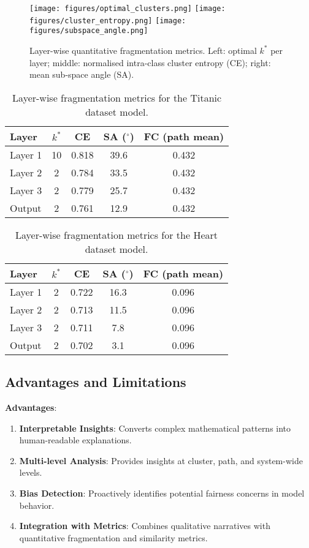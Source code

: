 \begin{figure}[t]
    \centering
    \texttt{[image: figures/optimal\_clusters.png]}
    \texttt{[image: figures/cluster\_entropy.png]}
    \texttt{[image: figures/subspace\_angle.png]}
    \caption{Layer-wise quantitative fragmentation metrics.
    Left: optimal $k^*$ per layer;
    middle: normalised intra-class cluster entropy (CE);
    right: mean sub-space angle (SA).}
    \label{fig:fragmentation_metrics}
\end{figure}

\begin{table}[h!]
\centering
\caption{Layer-wise fragmentation metrics for the Titanic dataset model.}
\label{tab:fragmentation_metrics_titanic}
\begin{tabular}{lcccc}
\toprule
Layer & $k^*$ & CE & SA ($^\circ$) & FC (path mean) \\
\midrule
Layer 1 & 10 & 0.818 & 39.6 & 0.432 \\
Layer 2 &  2 & 0.784 & 33.5 & 0.432 \\
Layer 3 &  2 & 0.779 & 25.7 & 0.432 \\
Output  &  2 & 0.761 & 12.9 & 0.432 \\
\bottomrule
\end{tabular}
\end{table}

\begin{table}[h!]
\centering
\caption{Layer-wise fragmentation metrics for the Heart dataset model.}
\label{tab:fragmentation_metrics_heart}
\begin{tabular}{lcccc}
\toprule
Layer & $k^*$ & CE & SA ($^\circ$) & FC (path mean) \\
\midrule
Layer 1 & 2 & 0.722 & 16.3 & 0.096 \\
Layer 2 & 2 & 0.713 & 11.5 & 0.096 \\
Layer 3 & 2 & 0.711 &  7.8 & 0.096 \\
Output  & 2 & 0.702 &  3.1 & 0.096 \\
\bottomrule
\end{tabular}
\end{table}

\subsection{Advantages and Limitations}

\textbf{Advantages}:
\begin{enumerate}
    \item \textbf{Interpretable Insights}: Converts complex mathematical patterns into human-readable explanations.
    \item \textbf{Multi-level Analysis}: Provides insights at cluster, path, and system-wide levels.
    \item \textbf{Bias Detection}: Proactively identifies potential fairness concerns in model behavior.
    \item \textbf{Integration with Metrics}: Combines qualitative narratives with quantitative fragmentation and similarity metrics.
\end{enumerate}


